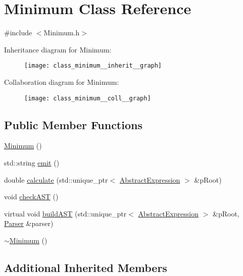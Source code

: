 \hypertarget{class_minimum}{}\section{Minimum Class Reference}
\label{class_minimum}


{\ttfamily \#include $<$Minimum.\+h$>$}



Inheritance diagram for Minimum\+:
\nopagebreak
\begin{figure}[H]
\begin{center}
\leavevmode
\texttt{[image: class\_minimum\_\_inherit\_\_graph]}
\end{center}
\end{figure}


Collaboration diagram for Minimum\+:
\nopagebreak
\begin{figure}[H]
\begin{center}
\leavevmode
\texttt{[image: class\_minimum\_\_coll\_\_graph]}
\end{center}
\end{figure}
\subsection*{Public Member Functions}
\begin{DoxyCompactItemize}
\item 
\mbox{\hyperlink{class_minimum_a757e1f05a875048a9baff1b422c8e71a}{Minimum}} ()
\item 
std\+::string \mbox{\hyperlink{class_minimum_a8a81bd6a451ad1ad38dd33a85e9d49cc}{emit}} ()
\item 
double \mbox{\hyperlink{class_minimum_a181a156021f98d15bd1aa6484ff587cc}{calculate}} (std\+::unique\+\_\+ptr$<$ \mbox{\hyperlink{class_abstract_expression}{Abstract\+Expression}} $>$ \&p\+Root)
\item 
void \mbox{\hyperlink{class_minimum_ab234ac7bb36a5e92c72d18f22a94c47a}{check\+A\+ST}} ()
\item 
virtual void \mbox{\hyperlink{class_minimum_abec83657924b745c348bee1ef300e580}{build\+A\+ST}} (std\+::unique\+\_\+ptr$<$ \mbox{\hyperlink{class_abstract_expression}{Abstract\+Expression}} $>$ \&p\+Root, \mbox{\hyperlink{class_parser}{Parser}} \&parser)
\item 
\mbox{\hyperlink{class_minimum_a6b69a901d23bcb75a82b78de6a4bc3af}{$\sim$\+Minimum}} ()
\end{DoxyCompactItemize}
\subsection*{Additional Inherited Members}


